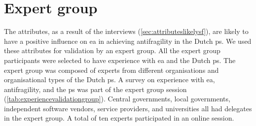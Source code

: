 \chapter{Expert group}
\label{ch:expertgroup}
\setcounter{footnote}{0}
The \glspl{attribute}, as a result of the interviews (\cref{sec:attributeslikelysf}), are likely to have a positive influence on \acrlong{ea} in achieving \gls{antifragility} in the Dutch \gls{ps}. We used these \glspl{attribute} for validation by an expert group. All the expert group participants were selected to have experience with \acrlong{ea} and the Dutch \gls{ps}. The expert group was composed of experts from different organisations and organisational types of the Dutch \gls{ps}. A survey on experience with \acrlong{ea}, \gls{antifragility}, and the \gls{ps} was part of the expert group session (\cref{tab:experiencevalidationgroup}). Central governments, local governments, independent software vendors, service providers, and universities all had delegates in the expert group. A total of ten experts participated in an online session. 
 
